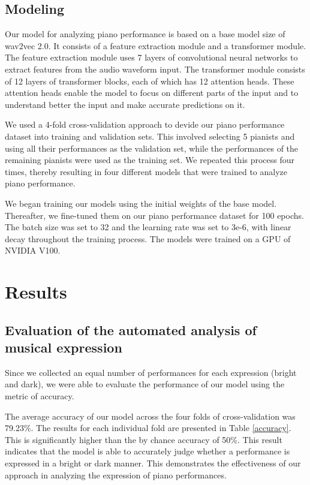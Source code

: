 \documentclass[manuscript,review,anonymous]{acmart}
\begin{document}
\subsection{Modeling}
Our model for analyzing piano performance is based on a base model size of wav2vec 2.0. 
It consists of a feature extraction module and a transformer module. 
The feature extraction module uses 7 layers of convolutional neural networks to extract features from the audio waveform input. 
The transformer module consists of 12 layers of transformer blocks, each of which has 12 attention heads. 
These attention heads enable the model to focus on different parts of the input and to understand better the input and make accurate predictions on it.

We used a 4-fold cross-validation approach to devide our piano performance dataset into training and validation sets. 
This involved selecting 5 pianists and using all their performances as the validation set, while the performances of the remaining pianists were used as the training set. 
We repeated this process four times, thereby resulting in four different models that were trained to analyze piano performance. 

We began training our models using the initial weights of the base model.  %
Thereafter, we fine-tuned them on our piano performance dataset for 100 epochs. 
The batch size was set to 32 and the learning rate was set to 3e-6, with linear decay throughout the training process. 
The models were trained on a GPU of NVIDIA V100. 


\section{Results}
\subsection{Evaluation of the automated analysis of musical expression}
Since we collected an equal number of performances for each expression (bright and dark), we were able to evaluate the performance of our model using the metric of accuracy. 

The average accuracy of our model across the four folds of cross-validation was 79.23\%. 
The results for each individual fold are presented in Table \ref{accuracy}. 
This is significantly higher than the by chance accuracy of 50\%.
This result indicates that the model is able to accurately judge whether a performance is expressed in a bright or dark manner. 
This demonstrates the effectiveness of our approach in analyzing the expression of piano performances.
\end{document}
